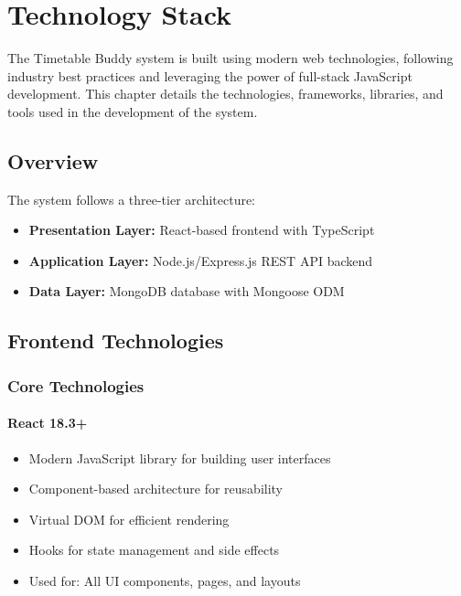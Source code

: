 \documentclass[12pt,a4paper]{report}
\begin{document}
\chapter{Technology Stack}

The Timetable Buddy system is built using modern web technologies, following industry best practices and leveraging the power of full-stack JavaScript development. This chapter details the technologies, frameworks, libraries, and tools used in the development of the system.

\section{Overview}

The system follows a three-tier architecture:
\begin{itemize}[leftmargin=*]
    \item \textbf{Presentation Layer:} React-based frontend with TypeScript
    \item \textbf{Application Layer:} Node.js/Express.js REST API backend
    \item \textbf{Data Layer:} MongoDB database with Mongoose ODM
\end{itemize}

\section{Frontend Technologies}

\subsection{Core Technologies}

\subsubsection{React 18.3+}
\begin{itemize}[leftmargin=*]
    \item Modern JavaScript library for building user interfaces
    \item Component-based architecture for reusability
    \item Virtual DOM for efficient rendering
    \item Hooks for state management and side effects
    \item Used for: All UI components, pages, and layouts
\end{itemize}
\end{document}
